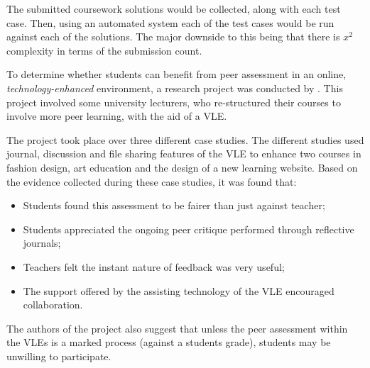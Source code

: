 \documentclass[sigplan,10pt,review]{acmart}\settopmatter{printfolios=true}
\begin{document}
The submitted coursework solutions would be collected, along with each
test case. Then, using an automated system each of the test cases
would be run against each of the solutions. The major downside to this
being that there is $x^2$ complexity in terms of the submission count.






To determine whether students can benefit from peer assessment in an
online, \textit{technology-enhanced} environment, a research project
was conducted by \citet{keppell_peer_2006}. This project
involved some university lecturers, who re-structured their courses to
involve more peer learning, with the aid of a \ac{VLE}.

The project took place over three different case studies. The
different studies used journal, discussion and file sharing features
of the \ac{VLE} to enhance two courses in fashion design, art education
and the design of a new learning website. Based on the evidence
collected during these case studies, it was found that:
\begin{itemize}
\item Students found this assessment to be fairer than just against
  teacher;
\item Students appreciated the ongoing peer critique performed through
  reflective journals;
\item Teachers felt the instant nature of feedback was very useful;
\item The support offered by the assisting technology of the \ac{VLE}
  encouraged collaboration.
\end{itemize}
The authors of the project also suggest that unless the peer
assessment within the \acp{VLE} is a marked process (against a
students grade), students may be unwilling to participate.
\end{document}
